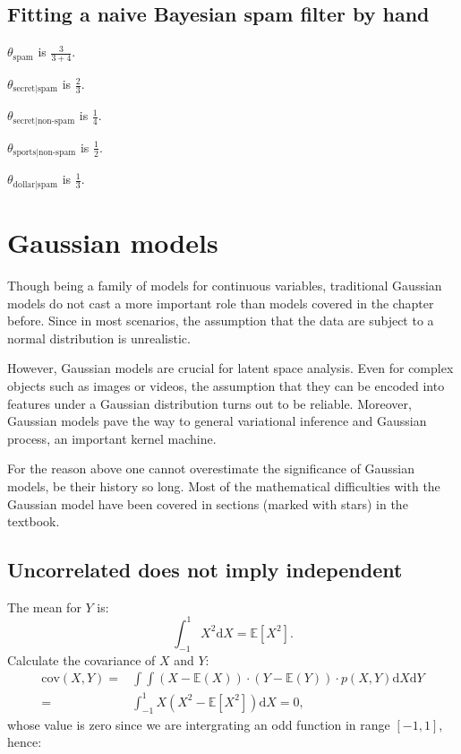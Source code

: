 \documentclass[UTF8]{ctexart}
\begin{document}
\subsection{Fitting a naive Bayesian spam filter by hand}
$\theta_{\text{spam}}$ is $\frac{3}{3+4}$.

$\theta_{\text{secret}|\text{spam}}$ is $\frac{2}{3}$.

$\theta_{\text{secret}|\text{non-spam}}$ is $\frac{1}{4}$.

$\theta_{\text{sports}|\text{non-spam}}$ is $\frac{1}{2}$.

$\theta_{\text{dollar}|\text{spam}}$ is $\frac{1}{3}$.

\newpage
\section{Gaussian models}
Though being a family of models for continuous variables, traditional Gaussian models do not cast a more important role than models covered in the chapter before.
Since in most scenarios, the assumption that the data are subject to a normal distribution is unrealistic.

However, Gaussian models are crucial for latent space analysis.
Even for complex objects such as images or videos, the assumption that they can be encoded into features under a Gaussian distribution turns out to be reliable.
Moreover, Gaussian models pave the way to general variational inference and Gaussian process, an important kernel machine.

For the reason above one cannot overestimate the significance of Gaussian models, be their history so long.
Most of the mathematical difficulties with the Gaussian model have been covered in sections (marked with stars) in the textbook.

\subsection{Uncorrelated does not imply independent}
The mean for $Y$ is:
$$\int_{-1}^{1}X^{2}\text{d}X=\mathbb{E}[X^{2}].$$
Calculate the covariance of $X$ and $Y$:
\begin{align}
\text{cov}(X,Y)=&\int\int (X-\mathbb{E}(X))\cdot (Y-\mathbb{E}(Y))\cdot p(X,Y)\text{d}X\text{d}Y \nonumber \\
=&\int_{-1}^{1}X(X^{2}-\mathbb{E}[X^{2}])\text{d}X=0, \nonumber
\end{align}
whose value is zero since we are intergrating an odd function in range $[-1,1]$, hence:
\end{document}
